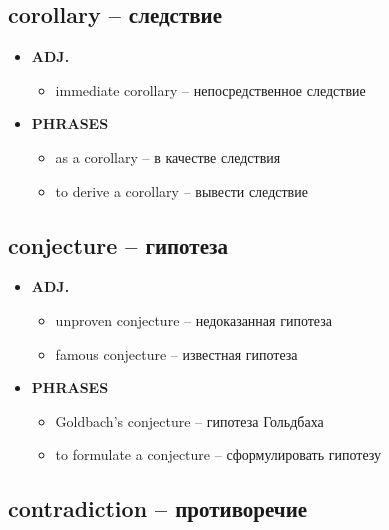 \documentclass[a4paper, 10pt]{article}
\theoremstyle{definition}
\theoremstyle{plain}
\theoremstyle{remark}
\begin{document}
\subsection{corollary – следствие}

\begin{itemize}
    \item \textbf{ADJ.}
    \begin{itemize}
        \item immediate corollary – непосредственное следствие
    \end{itemize}
    
    \item \textbf{PHRASES}
    \begin{itemize}
        \item as a corollary – в качестве следствия
        \item to derive a corollary – вывести следствие
    \end{itemize}
\end{itemize}

\subsection{conjecture – гипотеза}

\begin{itemize}
    \item \textbf{ADJ.}
    \begin{itemize}
        \item unproven conjecture – недоказанная гипотеза
        \item famous conjecture – известная гипотеза
    \end{itemize}
    
    \item \textbf{PHRASES}
    \begin{itemize}
        \item Goldbach's conjecture – гипотеза Гольдбаха
        \item to formulate a conjecture – сформулировать гипотезу
    \end{itemize}
\end{itemize}

\subsection{contradiction – противоречие}
\end{document}
